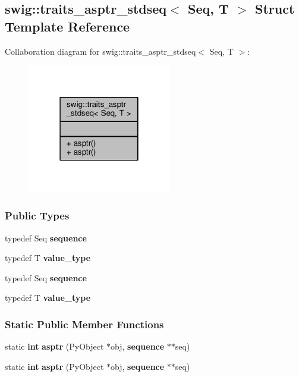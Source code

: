 \subsection{swig\+:\+:traits\+\_\+asptr\+\_\+stdseq$<$ Seq, T $>$ Struct Template Reference}
\label{structswig_1_1traits__asptr__stdseq}


Collaboration diagram for swig\+:\+:traits\+\_\+asptr\+\_\+stdseq$<$ Seq, T $>$\+:
\nopagebreak
\begin{figure}[H]
\begin{center}
\leavevmode
\includegraphics[width=178pt]{de/d2d/structswig_1_1traits__asptr__stdseq__coll__graph}
\end{center}
\end{figure}
\subsubsection*{Public Types}
\begin{DoxyCompactItemize}
\item 
typedef Seq {\bf sequence}
\item 
typedef T {\bf value\+\_\+type}
\item 
typedef Seq {\bf sequence}
\item 
typedef T {\bf value\+\_\+type}
\end{DoxyCompactItemize}
\subsubsection*{Static Public Member Functions}
\begin{DoxyCompactItemize}
\item 
static {\bf int} {\bf asptr} (Py\+Object $\ast$obj, {\bf sequence} $\ast$$\ast$seq)
\item 
static {\bf int} {\bf asptr} (Py\+Object $\ast$obj, {\bf sequence} $\ast$$\ast$seq)
\end{DoxyCompactItemize}


